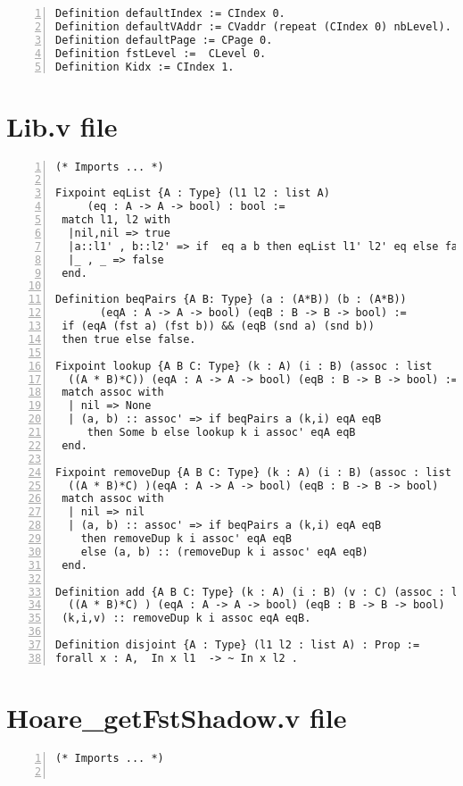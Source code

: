 \begin{appendices}
\begin{lstlisting}[caption = {PIP\_state.v file},xleftmargin=-.1\textwidth,
xrightmargin=-.1\textwidth,
mathescape=true,numbers=left]
Definition defaultIndex := CIndex 0.
Definition defaultVAddr := CVaddr (repeat (CIndex 0) nbLevel).
Definition defaultPage := CPage 0.
Definition fstLevel :=  CLevel 0.
Definition Kidx := CIndex 1.
\end{lstlisting}
\pagebreak
\section{Lib.v file} \label{LibFile}
\begin{lstlisting}[caption = {PIP\_state.v file},xleftmargin=-.1\textwidth,
xrightmargin=-.1\textwidth,
mathescape=true,numbers=left]
(* Imports ... *)

Fixpoint eqList {A : Type} (l1 l2 : list A) 
	 (eq : A -> A -> bool) : bool := 
 match l1, l2 with 
  |nil,nil => true
  |a::l1' , b::l2' => if  eq a b then eqList l1' l2' eq else false
  |_ , _ => false
 end.

Definition beqPairs {A B: Type} (a : (A*B)) (b : (A*B)) 
	   (eqA : A -> A -> bool) (eqB : B -> B -> bool) :=
 if (eqA (fst a) (fst b)) && (eqB (snd a) (snd b))  
 then true else false.

Fixpoint lookup {A B C: Type} (k : A) (i : B) (assoc : list 
  ((A * B)*C)) (eqA : A -> A -> bool) (eqB : B -> B -> bool) :=
 match assoc with
  | nil => None  
  | (a, b) :: assoc' => if beqPairs a (k,i) eqA eqB 
  	 then Some b else lookup k i assoc' eqA eqB
 end. 
 
Fixpoint removeDup {A B C: Type} (k : A) (i : B) (assoc : list 
  ((A * B)*C) )(eqA : A -> A -> bool) (eqB : B -> B -> bool)   :=
 match assoc with
  | nil => nil
  | (a, b) :: assoc' => if beqPairs a (k,i) eqA eqB 
  	then removeDup k i assoc' eqA eqB 
  	else (a, b) :: (removeDup k i assoc' eqA eqB)
 end.

Definition add {A B C: Type} (k : A) (i : B) (v : C) (assoc : list 
  ((A * B)*C) ) (eqA : A -> A -> bool) (eqB : B -> B -> bool)  :=
 (k,i,v) :: removeDup k i assoc eqA eqB.

Definition disjoint {A : Type} (l1 l2 : list A) : Prop := 
forall x : A,  In x l1  -> ~ In x l2 . 
\end{lstlisting}
\pagebreak
\section{Hoare\_getFstShadow.v file} \label{getFstFile}
\begin{lstlisting}[caption = {Hoare\_getFstShadow.v file},xleftmargin=-.1\textwidth,
xrightmargin=-.1\textwidth,
mathescape=true,numbers=left]
(* Imports ... *)


\end{lstlisting}
\end{appendices}

